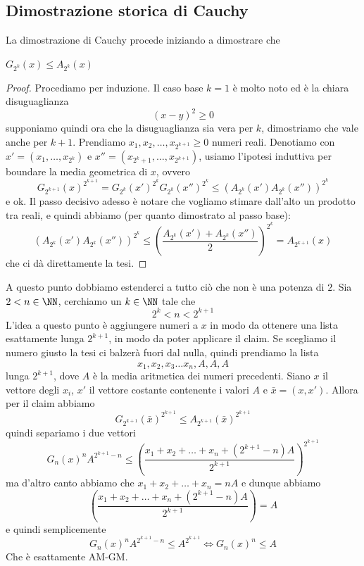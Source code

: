 \documentclass[11pt]{scrartcl}
\begin{document}
  	\subsection{Dimostrazione storica di Cauchy}
  	La dimostrazione di Cauchy procede iniziando a dimostrare che 
  	\begin{claim}
  		$G_{2^k}(x)\le A_{2^k}(x)$
  	\end{claim}
  	\begin{proof}
  		Procediamo per induzione. Il caso base $k=1$ è molto noto ed è la chiara disuguaglianza
  		$$(x-y)^2\ge 0$$
  		supponiamo quindi ora che la disuguaglianza sia vera per $k$, dimostriamo che vale anche per $k+1$. Prendiamo $x_1,x_2,\dots,x_{2^{k+1}}\ge 0$ numeri reali. Denotiamo con $x'=(x_1,\dots,x_{2^k})$ e $x''=(x_{2^k+1},\dots,x_{2^{k+1}})$, usiamo l'ipotesi induttiva per boundare la media geometrica di $x$, ovvero
  		$$G_{2^{k+1}}(x)^{2^{k+1}}=G_{2^k}(x')^{2^k}G_{2^k}(x'')^{2^k}\le \left(A_{2^k}(x')A_{2^k}(x'')\right)^{2^k}$$
  		e ok. Il passo decisivo adesso è notare che vogliamo stimare dall'alto un prodotto tra reali, e quindi abbiamo (per quanto dimostrato al passo base):
  		$$\left(A_{2^k}(x')A_{2^k}(x'')\right)^{2^k}\le \left(\frac{A_{2^k}(x')+A_{2^k}(x'')}{2}\right)^{2^k}=A_{2^{k+1}}(x)$$
  		che ci dà direttamente la tesi.
  	\end{proof}
  	A questo punto dobbiamo estenderci a tutto ciò che non è una potenza di $2$. Sia $2<n\in\NN$, cerchiamo un $k\in\NN$ tale che
  	$$2^k<n<2^{k+1}$$
  	L'idea a questo punto è aggiungere numeri a $x$ in modo da ottenere una lista esattamente lunga $2^{k+1}$, in modo da poter applicare il claim. Se scegliamo il numero giusto la tesi ci balzerà fuori dal nulla, quindi prendiamo la lista
  	$$x_1,x_2,x_3\dots x_n, A,A,A$$ 
  	lunga $2^{k+1}$, dove $A$ è la media aritmetica dei numeri precedenti. Siano $x$ il vettore degli $x_i$, $x'$ il vettore costante contenente i valori $A$ e $\bar{x}=(x,x')$. Allora per il claim abbiamo
  	$$G_{2^{k+1}}(\bar{x})^{2^{k+1}}\le A_{2^{k+1}}(\bar{x})^{2^{k+1}}$$
  	quindi separiamo i due vettori
  	$$G_n(x)^nA^{2^{k+1}-n}\le \left(\frac{x_1+x_2+\dots+x_n+\left(2^{k+1}-n\right)A}{2^{k+1}}\right)^{2^{k+1}}$$
  	ma d'altro canto abbiamo che $x_1+x_2+\dots+x_n=nA$ e dunque abbiamo
  	$$\left(\frac{x_1+x_2+\dots+x_n+\left(2^{k+1}-n\right)A}{2^{k+1}}\right)=A$$
  	e quindi semplicemente
  	$$G_n(x)^n A^{2^{k+1}-n}\le A^{2^{k+1}}\iff G_n(x)^n\le A$$
  	Che è esattamente AM-GM.
  	
\end{document}

